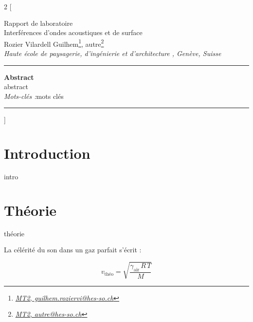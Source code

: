 ﻿\documentclass[a4paper,10pt]{article}
\begin{document}

\begin{multicols*}{2}
[ %
%
\begin{center}
\vspace*{0mm}
{\large
Rapport de laboratoire\\
\vspace{3mm}
Interférences d'ondes acoustiques et de surface   %
}\\
\vspace{8mm}
Rozier Vilardell Guilhem\footnote{\textit{\href{guilhem.roziervi@hes-so.ch}{MT2, guilhem.roziervi@hes-so.ch}}},
autre\footnote{\textit{\href{autre@hes-so.ch}{MT2, autre@hes-so.ch}}} 
\\
%
\vspace{3mm}
\footnotesize{
\textit{Haute école de paysagerie, d'ingénierie et d'architecture , Genève, Suisse}
}\\
\vspace{9mm}
\end{center}
%
\rule{\linewidth}{0.4pt} %
\onehalfspacing
\textbf{Abstract}\\
abstract\\
\noindent\textit{Mots-clés :}mots clés\\
\rule{\linewidth}{0.4pt} %
]
\singlespacing

\tableofcontents

\printnomenclature

\setlength{\parskip}{1pt} %

\section{Introduction}

intro
\section{Théorie}

théorie


La célérité du son dans un gaz parfait s'écrit :

\begin{equation}
v_{\mathrm{théo}} = \sqrt{\frac{\gamma_{\mathrm{air}}\,R\,T}{M}}
\label{eq:vson}
\end{equation}


\end{multicols*}
\end{document}
